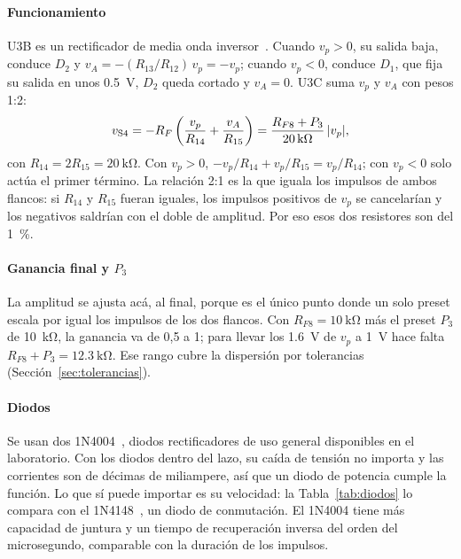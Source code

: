 \paragraph*{Funcionamiento} U3B es un rectificador de media onda inversor~\cite{coughlin}. Cuando $v_p > 0$, su salida baja, conduce $D_2$ y $v_A = -(R_{13}/R_{12})\, v_p = -v_p$; cuando $v_p < 0$, conduce $D_1$, que fija su salida en unos \SI{0,5}{\volt}, $D_2$ queda cortado y $v_A = 0$. U3C suma $v_p$ y $v_A$ con pesos 1:2:
\begin{equation}
v_{\mathrm{S4}} = -R_{F}\left(\frac{v_p}{R_{14}} + \frac{v_A}{R_{15}}\right) = \frac{R_{F8} + P_3}{\SI{20}{\kilo\ohm}}\,|v_p|,
\end{equation}
con $R_{14} = 2R_{15} = \SI{20}{\kilo\ohm}$. Con $v_p > 0$, $-v_p/R_{14} + v_p/R_{15} = v_p/R_{14}$; con $v_p < 0$ solo actúa el primer término. La relación 2:1 es la que iguala los impulsos de ambos flancos: si $R_{14}$ y $R_{15}$ fueran iguales, los impulsos positivos de $v_p$ se cancelarían y los negativos saldrían con el doble de amplitud. Por eso esos dos resistores son del \SI{1}{\percent}.

\paragraph*{Ganancia final y $P_3$} La amplitud se ajusta acá, al final, porque es el único punto donde un solo preset escala por igual los impulsos de los dos flancos. Con $R_{F8} = \SI{10}{\kilo\ohm}$ más el preset $P_3$ de \SI{10}{\kilo\ohm}, la ganancia va de 0,5 a 1; para llevar los \SI{1,6}{\volt} de $v_p$ a \SI{1}{\volt} hace falta $R_{F8} + P_3 = \SI{12,3}{\kilo\ohm}$. Ese rango cubre la dispersión por tolerancias (Sección~\ref{sec:tolerancias}).

\paragraph*{Diodos} Se usan dos 1N4004~\cite{1n4004}, diodos rectificadores de uso general disponibles en el laboratorio. Con los diodos dentro del lazo, su caída de tensión no importa y las corrientes son de décimas de miliampere, así que un diodo de potencia cumple la función. Lo que sí puede importar es su velocidad: la Tabla~\ref{tab:diodos} lo compara con el 1N4148~\cite{1n4148}, un diodo de conmutación. El 1N4004 tiene más capacidad de juntura y un tiempo de recuperación inversa del orden del microsegundo, comparable con la duración de los impulsos.

